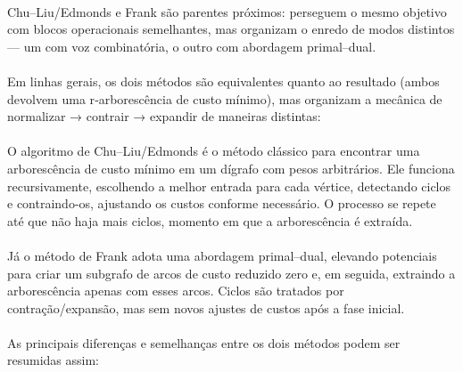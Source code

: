 \documentclass[12pt,a4paper]{article}
\begin{document}
\paragraph{}
Chu–Liu/Edmonds e Frank são parentes próximos: perseguem o mesmo objetivo com blocos operacionais semelhantes, mas organizam o enredo de modos distintos — um com voz combinatória, o outro com abordagem primal–dual.

\paragraph{}
Em linhas gerais, os dois métodos são equivalentes quanto ao resultado (ambos devolvem uma r‑arborescência de custo mínimo), mas organizam a mecânica de normalizar → contrair → expandir de maneiras distintas:

\paragraph{}
O algoritmo de Chu–Liu/Edmonds \cite{chu1965,edmonds1967optimum} é o método clássico para encontrar uma arborescência de custo mínimo em um dígrafo com pesos arbitrários. Ele funciona recursivamente, escolhendo a melhor entrada para cada vértice, detectando ciclos e contraindo-os, ajustando os custos conforme necessário. O processo se repete até que não haja mais ciclos, momento em que a arborescência é extraída.

\paragraph{}
Já o método de Frank \cite{frank1981,frank2014} adota uma abordagem primal–dual, elevando potenciais para criar um subgrafo de arcos de custo reduzido zero e, em seguida, extraindo a arborescência apenas com esses arcos. Ciclos são tratados por contração/expansão, mas sem novos ajustes de custos após a fase inicial.

\paragraph{}
As principais diferenças e semelhanças entre os dois métodos podem ser resumidas assim:
\end{document}
